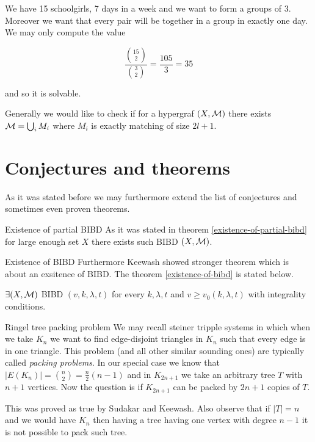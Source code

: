 \begin{example}
	We have 15 schoolgirls, 7 days in a week and we want to form a groups of 3. Moreover we want that every pair will be together in a group in exactly one day. We may only compute the value
	
	$$
	\frac{\binom{15}{2}}{\binom{3}{2}} = \frac{105}{3} = 35
	$$
	
	\noindent and so it is solvable.
\end{example}

Generally we would like to check if for a hypergraf $(X, \mathcal{M})$ there exists $\mathcal{M} = \bigcup_i M_i$ where $M_i$ is exactly matching of size $2l+1$.

\section{Conjectures and theorems}

As it was stated before we may furthermore extend the list of conjectures and sometimes even proven theorems.

\begin{topic}{Existence of partial BIBD}
	As it was stated in theorem \ref{existence-of-partial-bibd} for large enough set $X$ there exists such BIBD $(X, \mathcal{M})$.
\end{topic}

\begin{topic}{Existence of BIBD}
	Furthermore Keewash showed stronger theorem which is about an exsitence of BIBD. The theorem \ref{existence-of-bibd} is stated below.
	
	\begin{thm}
		$\exists (X, \mathcal{M})$ BIBD $(v,k,\lambda,t)$ for every $k,\lambda,t$ and $v \geq v_0 (k,\lambda,t)$ with integrality conditions.
		\label{existence-of-bibd}
	\end{thm}
\end{topic}

\begin{topic}{Ringel tree packing problem}
	We may recall steiner tripple systems in which when we take $K_n$ we want to find edge-disjoint triangles in $K_n$ such that every edge is in one triangle. This problem (and all other similar sounding ones) are typically called \textit{packing problems}. In our special case we know that $|E(K_n)| = \binom{n}{2} = \frac{n}{2} (n-1)$ and in $K_{2n+1}$ we take an arbitrary tree $T$ with $n+1$ vertices. Now the question is if $K_{2n+1}$ can be packed by $2n+1$ copies of $T$.
	
	This was proved as true by Sudakar and Keewash. Also observe that if $|T| = n$ and we would have $K_n$ then having a tree having one vertex with degree $n-1$ it is not possible to pack such tree.
\end{topic}

